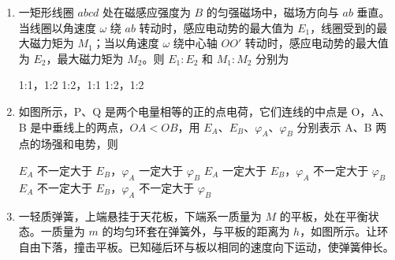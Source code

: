 \documentclass[\gkver]{gaokaozhenti}
\begin{document}
\begin{enumerate}
{$l_{a} = 0.9\Um$，$l_{b} = 2.5\Um$}
{$l_{a} = 2.4\Um$，$l_{b} = 4.0\Um$}
{$l_{a} = 4.0\Um$，$l_{b} = 2.4\Um$}


\item
一矩形线圈 $abcd$ 处在磁感应强度为 $B$ 的匀强磁场中，磁场方向与 $ab$ 垂直。当线圈以角速度 $\omega$ 绕 $ab$ 转动时，感应电动势的最大值为 $E_{1}$，线圈受到的最大磁力矩为 $M_{1}$；当以角速度 $\omega$ 绕中心轴 $OO'$ 转动时，感应电动势的最大值为 $E_{2}$，最大磁力矩为 $M_{2}$。则 $E_{1}:E_{2}$ 和 $M_{1}:M_{2}$ 分别为 
\onepicture[w=3.80cm]{}

{1:1，1:2}
{1:2，1:1}
{1:2，1:2}


\item
如图所示，P、Q 是两个电量相等的正的点电荷，它们连线的中点是 O，A、B 是中垂线上的两点，$OA < OB$，用 $E_{A}$、$E_{B}$、$\varphi_{A}$、$\varphi_{B}$ 分别表示 A、B 两点的场强和电势，则 
\onepicture[w=3.94cm]{}

{$E_{A}$ 不一定大于 $E_{B}$，$\varphi_{A}$ 一定大于 $\varphi_{B}$}
{$E_{A}$ 一定大于 $E_{B}$，$\varphi_{A}$ 不一定大于 $\varphi_{B}$}
{$E_{A}$ 不一定大于 $E_{B}$，$\varphi_{A}$ 不一定大于 $\varphi_{B}$}


\item
一轻质弹簧，上端悬挂于天花板，下端系一质量为 $M$ 的平板，处在平衡状态。一质量为 $m$ 的均匀环套在弹簧外，与平板的距离为 $h$，如图所示。让环自由下落，撞击平板。已知碰后环与板以相同的速度向下运动，使弹簧伸长。 


\end{enumerate}
\end{document}
